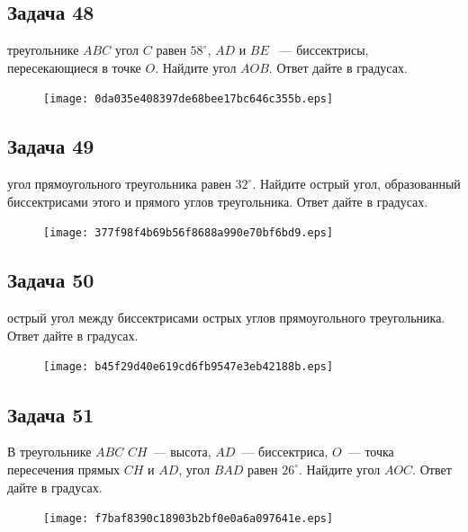 \documentclass[a4paper,10pt]{article} %
\begin{document}
\begin{spacing}{1.0}
{\subsection*{Задача 48}
 треугольнике $ABC$ угол $C$ равен $58^\circ$, $AD$ и $BE$ ~--- биссектрисы, пересекающиеся в точке $O$. Найдите угол $AOB$. Ответ дайте в градусах.

\vspace{1.5cm}

\begin{figure}{\texttt{[image: 0da035e408397de68bee17bc646c355b.eps]}}\end{figure}
\subsection*{Задача 49}
 угол прямоугольного треугольника равен $32^\circ$. Найдите острый угол, образованный биссектрисами этого и прямого углов треугольника. Ответ дайте в градусах.

\vspace{1.5cm}

\begin{figure}{\texttt{[image: 377f98f4b69b56f8688a990e70bf6bd9.eps]}}\end{figure}
\subsection*{Задача 50}
 острый угол между биссектрисами острых углов прямоугольного треугольника. Ответ дайте в градусах.

\vspace{1.5cm}

\begin{figure}{\texttt{[image: b45f29d40e619cd6fb9547e3eb42188b.eps]}}\end{figure}
\subsection*{Задача 51}
В треугольнике $ABC$ $CH$~--- высота, $AD$~--- биссектриса, $O$~--- точка пересечения прямых $CH$ и $AD$, угол $BAD$ равен $26^\circ$. Найдите угол $AOC$. Ответ дайте в градусах.

\vspace{1.5cm}

\begin{figure}{\texttt{[image: f7baf8390c18903b2bf0e0a6a097641e.eps]}}\end{figure}
}
\end{spacing}
\end{document}
